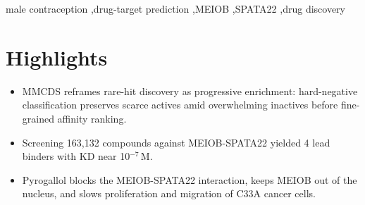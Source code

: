 \documentclass[preprint,12pt]{elsarticle}
\theoremstyle{plain}
\theoremstyle{definition}
\theoremstyle{remark}
\begin{document}
\begin{frontmatter}
\begin{abstract}
The development of male contraceptives is a critical global priority in reproductive health, essential for advancing reproductive health systems and optimizing family planning decisions. However, current research on its molecular targets is limited by target complexity and the low efficiency of compound screening, which hampers clinical translation. To address these challenges, we developed MMCDS, a multi-stage, multi-model framework that progressively enriches and prioritizes compounds targeting the MEIOB--SPATA22 complex. MMCDS first applies an attention-based drug--target interaction classifier under complementary coarse-to-fine training strategies, using fingerprint-guided hard-negative selection to prevent abundant inactive compounds from overwhelming rare potential actives. The enriched candidate pool is subsequently evaluated by a drug--target affinity model pretrained through structure--text contrastive learning and fine- tuned with joint regression and ranking objectives, enabling quantitative affinity estimation and reliable candidate prioritization despite limited target-specific data. The highest-ranked compounds are then subjected to protein-binding assays and cellular functional validation. Four lead compounds were experimentally identified, with the strongest binder exhibiting an equilibrium dissociation constant on the order of $10^{-7}$\,M. In virtual screening benchmarks, MMCDS improved predictive performance by 3.80--10.23\% over state-of-the-art deep learning methods.
\end{abstract}

\begin{keyword}
male contraception \sep drug-target prediction \sep MEIOB \sep SPATA22 \sep drug discovery
\end{keyword}

\end{frontmatter}

\section*{Highlights}
\begin{itemize}
    \item MMCDS reframes rare-hit discovery as progressive enrichment: hard-negative classification preserves scarce actives amid overwhelming inactives before fine-grained affinity ranking.
    \item Screening 163,132 compounds against MEIOB-SPATA22 yielded 4 lead binders with KD near 10$^{-7}$\,M.
    \item Pyrogallol blocks the MEIOB-SPATA22 interaction, keeps MEIOB out of the nucleus, and slows proliferation and migration of C33A cancer cells.
\end{itemize}
\end{document}
